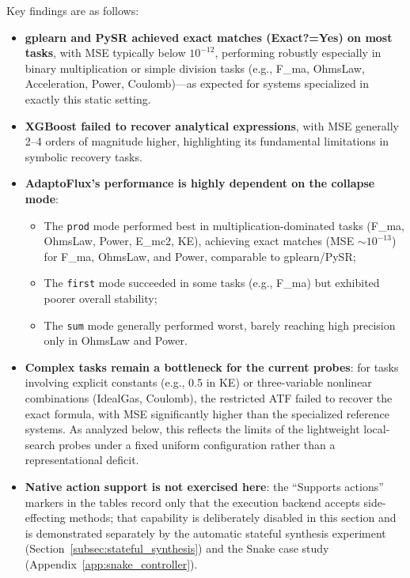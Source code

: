 Key findings are as follows:
\begin{itemize}
    \item \textbf{gplearn and PySR achieved exact matches (Exact?=Yes) on most tasks}, with MSE typically below $10^{-12}$, performing robustly especially in binary multiplication or simple division tasks (e.g., F\_ma, OhmsLaw, Acceleration, Power, Coulomb)---as expected for systems specialized in exactly this static setting.
    \item \textbf{XGBoost failed to recover analytical expressions}, with MSE generally 2--4 orders of magnitude higher, highlighting its fundamental limitations in symbolic recovery tasks.
    \item \textbf{AdaptoFlux's performance is highly dependent on the collapse mode}:
        \begin{itemize}
            \item The \texttt{prod} mode performed best in multiplication-dominated tasks (F\_ma, OhmsLaw, Power, E\_mc2, KE), achieving exact matches (MSE $\sim 10^{-13}$) for F\_ma, OhmsLaw, and Power, comparable to gplearn/PySR;
            \item The \texttt{first} mode succeeded in some tasks (e.g., F\_ma) but exhibited poorer overall stability;
            \item The \texttt{sum} mode generally performed worst, barely reaching high precision only in OhmsLaw and Power.
        \end{itemize}
    \item \textbf{Complex tasks remain a bottleneck for the current probes}: for tasks involving explicit constants (e.g., 0.5 in KE) or three-variable nonlinear combinations (IdealGas, Coulomb), the restricted ATF failed to recover the exact formula, with MSE significantly higher than the specialized reference systems. As analyzed below, this reflects the limits of the lightweight local-search probes under a fixed uniform configuration rather than a representational deficit.
    \item \textbf{Native action support is not exercised here}: the ``Supports actions'' markers in the tables record only that the execution backend accepts side-effecting methods; that capability is deliberately disabled in this section and is demonstrated separately by the automatic stateful synthesis experiment (Section~\ref{subsec:stateful_synthesis}) and the Snake case study (Appendix~\ref{app:snake_controller}).
\end{itemize}

